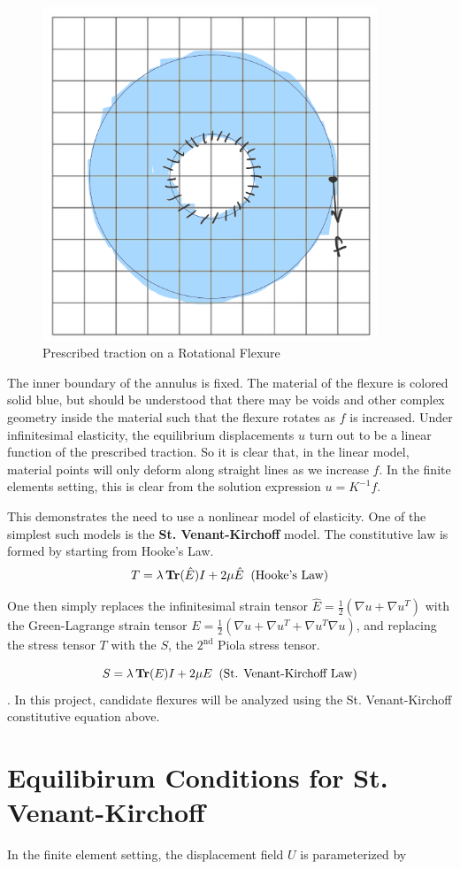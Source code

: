 \documentclass[11pt,letterpaper]{article}
\begin{document}
\begin{figure}[h!]
\begin{center}
\includegraphics[width=10cm, keepaspectratio]{prescribed_traction_experiment}
\caption{Prescribed traction on a Rotational Flexure}
\label{prescribed-traction-experiment}
\end{center}
\end{figure}

The inner boundary of the annulus is fixed. The material of the flexure is colored solid blue, but should be understood that there may be voids and other complex geometry inside the material such that the flexure rotates as $f$ is increased. Under infinitesimal elasticity, the equilibrium displacements  $u$ turn out to be a linear function of the prescribed traction. So it is clear that, in the linear model, material points will only deform along straight lines as we increase $f$. In the finite elements setting, this is clear from the solution expression $u = K^{-1} f$.

This demonstrates the need to use a nonlinear model of elasticity. One of the simplest such models is the \textbf{St. Venant-Kirchoff} model. The constitutive law is formed by starting from Hooke's Law.
$$ T = \lambda \mathop{\bf Tr}(\hat E) I + 2 \mu \hat E \;\; \text{(Hooke's Law)}$$

One then simply replaces the infinitesimal strain tensor $\hat{E} = \frac 1 2 (\nabla u + \nabla u^T)$ with the Green-Lagrange strain tensor $E =\frac 1 2 (\nabla u + \nabla u^T + \nabla u^T \nabla u) $, and replacing the stress tensor $T$ with the $ S$, the $2^\text{nd}$ Piola stress tensor.

$$ S = \lambda \mathop{\bf Tr}(E) I + 2 \mu E \;\; \text{(St. Venant-Kirchoff Law)}$$. In this project, candidate flexures will be analyzed using the St. Venant-Kirchoff constitutive equation above.

\section{Equilibirum Conditions for St. Venant-Kirchoff}
In the finite element setting, the displacement field $U$ is parameterized by  
\end{document}
